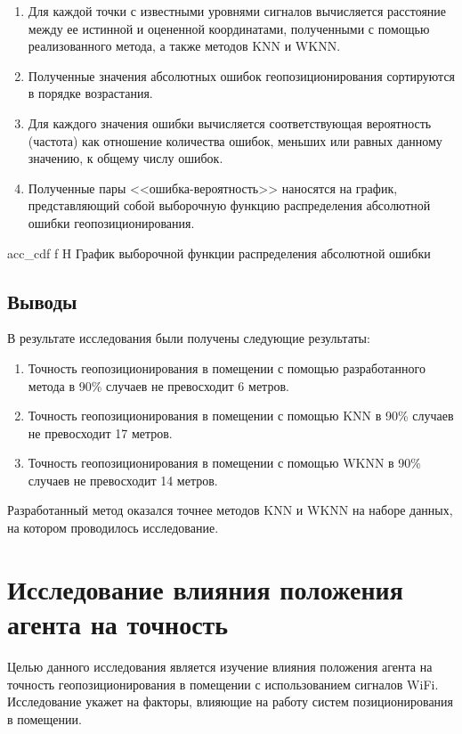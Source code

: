 \begin{enumerate}
    \item Для каждой точки с известными уровнями сигналов вычисляется расстояние между ее истинной и оцененной координатами, полученными с помощью реализованного метода, а также методов KNN и WKNN.
    \item Полученные значения абсолютных ошибок геопозиционирования сортируются в порядке возрастания.
    \item Для каждого значения ошибки вычисляется соответствующая вероятность (частота) как отношение количества ошибок, меньших или равных данному значению, к общему числу ошибок.
    \item Полученные пары <<ошибка-вероятность>> наносятся на график, представляющий собой выборочную функцию распределения абсолютной ошибки геопозиционирования.
\end{enumerate}

    {acc_cdf}
    {f}
    {H}
    {\linewidth}
    {График выборочной функции распределения абсолютной ошибки}

\subsection{Выводы}

В результате исследования были получены следующие результаты:

\begin{enumerate}
    \item Точность геопозиционирования в помещении с помощью разработанного метода в 90\% случаев не превосходит 6 метров.
    \item Точность геопозиционирования в помещении с помощью KNN в 90\% случаев не превосходит 17 метров.
    \item Точность геопозиционирования в помещении с помощью WKNN в 90\% случаев не превосходит 14 метров.
\end{enumerate}

Разработанный метод оказался точнее методов KNN и WKNN на наборе данных, на котором проводилось исследование.

\clearpage

\section{Исследование влияния положения агента на точность}

Целью данного исследования является изучение влияния положения агента на точность геопозиционирования в помещении с использованием сигналов WiFi. Исследование укажет на факторы, влияющие на работу систем позиционирования в помещении.

